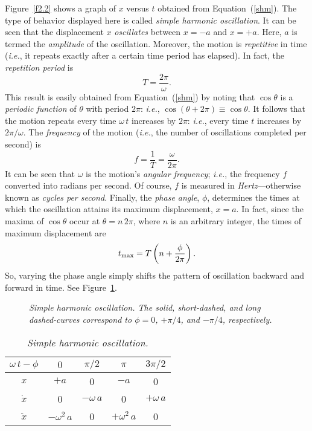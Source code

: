 Figure~\ref{f2.2} shows a graph of $x$ versus $t$ obtained from Equation~(\ref{shm}). The type of behavior  displayed here is
called {\em simple harmonic oscillation}.
It can be seen that
the displacement $x$ {\em oscillates}\/ between $x=-a$ and $x=+a$. Here, $a$ is termed the {\em amplitude}\/
of the oscillation. Moreover, the motion is {\em repetitive}\/ in time ({\em i.e.}, it repeats exactly after
a certain time period has elapsed). In fact, the {\em repetition period}\/ is
\begin{equation}
T = \frac{2\pi}{\omega}.
\end{equation}
This result is easily obtained from Equation~(\ref{shm}) by noting that $\cos\theta$ is a {\em periodic function}\/
of $\theta$ with
period $2\pi$: {\em i.e.}, $\cos(\theta+2\pi) \equiv \cos\theta$.  It follows that
the motion repeats every time $\omega\,t$ increases by $2\pi$: {\em i.e.}, every time $t$ increases by $2\pi/\omega$.
The {\em frequency}\/ of the motion ({\em i.e.}, the number of oscillations completed per
second) is
\begin{equation}
f = \frac{1}{T} = \frac{\omega}{2\pi}.
\end{equation}
It can be seen that $\omega$ is the motion's {\em angular frequency}; {\em i.e.}, the frequency
$f$ converted into radians per second. Of course, $f$ is measured in {\em Hertz}---otherwise
known as {\em cycles per second}.
Finally, the {\em phase angle}, $\phi$, determines the times at which the oscillation attains its maximum displacement,
$x=a$. In fact, since the maxima of $\cos\theta$ occur at $\theta=n\,2\pi$, where
$n$ is an arbitrary integer, the times of maximum displacement are
\begin{equation}
t_{\rm max} = T \left(n + \frac{\phi}{2\pi}\right).
\end{equation}
So, varying the phase angle simply shifts the pattern of oscillation backward and forward in time. See Figure~\ref{f2.3}. 

\begin{figure}
\epsfysize=3in
\centerline{}
\caption{\em Simple harmonic oscillation. The
solid, short-dashed, and long dashed-curves correspond to $\phi = 0$, $+\pi/4$, and $-\pi/4$, respectively.}\label{f2.3}   
\end{figure}

\begin{table}[b]\centering
\begin{tabular}{c|cccc}\hline
$\omega\,t-\phi$ & $0$ & $\pi/2$ & $\pi$ & $3\pi/2$\\[0.5ex]\hline
$x$              & $+a$     & 0         & $-a$       & 0 \\[0.5ex]
$\dot{x}$        & 0        & $-\omega\,a$ & 0 & $+\omega\,a$ \\[0.5ex]
$\ddot{x}$       & $-\omega^2\,a$ &0& $+\omega^2\,a$ & 0
\end{tabular}
\caption{\em Simple harmonic oscillation.}\label{tshm}
\end{table}

